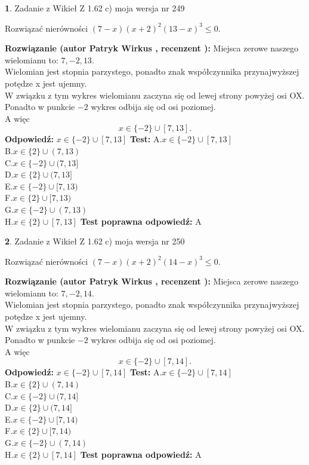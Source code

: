 \documentclass[12pt, a4paper]{article}
\theoremstyle{definition} %
\newtheorem{zad}{}
\newcommand{\zadStart}[1]{\begin{zad}#1\newline}
\newcommand{\zadStop}{\end{zad}}
\newcommand{\rozwStart}[2]{\noindent \textbf{Rozwiązanie (autor #1 , recenzent #2): }\newline}
\newcommand{\rozwStop}{\newline}
\newcommand{\odpStart}{\noindent \textbf{Odpowiedź:}\newline}
\newcommand{\odpStop}{\newline}
\newcommand{\testStart}{\noindent \textbf{Test:}\newline}
\newcommand{\testStop}{\newline}
\newcommand{\kluczStart}{\noindent \textbf{Test poprawna odpowiedź:}\newline}
\newcommand{\kluczStop}{\newline}
\begin{document}
\zadStart{Zadanie z Wikieł Z 1.62 c) moja wersja nr 249}

Rozwiązać nierówności $(7-x)(x+2)^{2}(13-x)^{3}\le0$.
\zadStop
\rozwStart{Patryk Wirkus}{}
Miejsca zerowe naszego wielomianu to: $7, -2, 13$.\\
Wielomian jest stopnia parzystego, ponadto znak współczynnika przy\linebreak najwyższej potędze x jest ujemny.\\ W związku z tym wykres wielomianu zaczyna się od lewej strony powyżej osi OX.\\
Ponadto w punkcie $-2$ wykres odbija się od osi poziomej.\\
A więc $$x \in \{-2\} \cup [7,13].$$
\rozwStop
\odpStart
$x \in \{-2\} \cup [7,13]$
\odpStop
\testStart
A.$x \in \{-2\} \cup [7,13]$\\
B.$x \in \{2\} \cup (7,13)$\\
C.$x \in \{-2\} \cup (7,13]$\\
D.$x \in \{2\} \cup (7,13]$\\
E.$x \in \{-2\} \cup [7,13)$\\
F.$x \in \{2\} \cup [7,13)$\\
G.$x \in \{-2\} \cup (7,13)$\\
H.$x \in \{2\} \cup [7,13]$
\testStop
\kluczStart
A
\kluczStop



\zadStart{Zadanie z Wikieł Z 1.62 c) moja wersja nr 250}

Rozwiązać nierówności $(7-x)(x+2)^{2}(14-x)^{3}\le0$.
\zadStop
\rozwStart{Patryk Wirkus}{}
Miejsca zerowe naszego wielomianu to: $7, -2, 14$.\\
Wielomian jest stopnia parzystego, ponadto znak współczynnika przy\linebreak najwyższej potędze x jest ujemny.\\ W związku z tym wykres wielomianu zaczyna się od lewej strony powyżej osi OX.\\
Ponadto w punkcie $-2$ wykres odbija się od osi poziomej.\\
A więc $$x \in \{-2\} \cup [7,14].$$
\rozwStop
\odpStart
$x \in \{-2\} \cup [7,14]$
\odpStop
\testStart
A.$x \in \{-2\} \cup [7,14]$\\
B.$x \in \{2\} \cup (7,14)$\\
C.$x \in \{-2\} \cup (7,14]$\\
D.$x \in \{2\} \cup (7,14]$\\
E.$x \in \{-2\} \cup [7,14)$\\
F.$x \in \{2\} \cup [7,14)$\\
G.$x \in \{-2\} \cup (7,14)$\\
H.$x \in \{2\} \cup [7,14]$
\testStop
\kluczStart
A
\kluczStop
\end{document}
